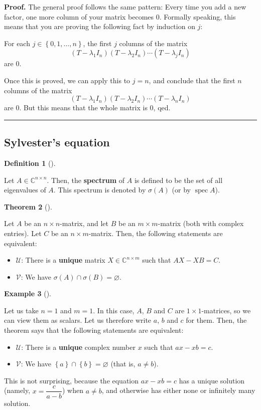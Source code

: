 \documentclass[numbers=enddot,12pt,final,onecolumn,notitlepage]{scrartcl}%
\numberwithin{exer}{subsection}
\theoremstyle{definition}
\newtheorem{theo}{Theorem}[subsection]
\newenvironment{theorem}[1][]
{\begin{theo}[#1]\begin{leftbar}}
{\end{leftbar}\end{theo}}
\newtheorem{defi}[theo]{Definition}
\newenvironment{definition}[1][]
{\begin{defi}[#1]\begin{leftbar}}
{\end{leftbar}\end{defi}}
\newtheorem{exam}[theo]{Example}
\newenvironment{example}[1][]
{\begin{exam}[#1]\begin{leftbar}}
{\end{leftbar}\end{exam}}
\newenvironment{proof}[1][Proof]{\noindent\textbf{#1.} }{\ \rule{0.5em}{0.5em}}
\begin{document}
\begin{proof}
The general proof follows the same pattern: Every time you add a new factor,
one more column of your matrix becomes $0$. Formally speaking, this means that
you are proving the following fact by induction on $j$:

For each $j\in\left\{  0,1,\ldots,n\right\}  $, the first $j$ columns of the
matrix%
\[
\left(  T-\lambda_{1}I_{n}\right)  \left(  T-\lambda_{2}I_{n}\right)
\cdots\left(  T-\lambda_{j}I_{n}\right)
\]
are $0$.

Once this is proved, we can apply this to $j=n$, and conclude that the first
$n$ columns of the matrix%
\[
\left(  T-\lambda_{1}I_{n}\right)  \left(  T-\lambda_{2}I_{n}\right)
\cdots\left(  T-\lambda_{n}I_{n}\right)
\]
are $0$. But this means that the whole matrix is $0$, qed.
\end{proof}

\subsection{Sylvester's equation}

\begin{definition}
Let $A\in\mathbb{C}^{n\times n}$. Then, the \textbf{spectrum} of $A$ is
defined to be the set of all eigenvalues of $A$. This spectrum is denoted by
$\sigma\left(  A\right)  $ (or by $\operatorname*{spec}A$).
\end{definition}

\begin{theorem}
Let $A$ be an $n\times n$-matrix, and let $B$ be an $m\times m$-matrix (both
with complex entries). Let $C$ be an $n\times m$-matrix. Then, the following
statements are equivalent:

\begin{itemize}
\item $\mathcal{U}$: There is a \textbf{unique} matrix $X\in\mathbb{C}%
^{n\times m}$ such that $AX-XB=C$.

\item $\mathcal{V}$: We have $\sigma\left(  A\right)  \cap\sigma\left(
B\right)  =\varnothing$.
\end{itemize}
\end{theorem}

\begin{example}
Let us take $n=1$ and $m=1$. In this case, $A$, $B$ and $C$ are $1\times
1$-matrices, so we can view them as scalars. Let us therefore write $a$, $b$
and $c$ for them. Then, the theorem says that the following statements are equivalent:

\begin{itemize}
\item $\mathcal{U}$: There is a \textbf{unique} complex number $x$ such that
$ax-xb=c$.

\item $\mathcal{V}$: We have $\left\{  a\right\}  \cap\left\{  b\right\}
=\varnothing$ (that is, $a\neq b$).
\end{itemize}

This is not surprising, because the equation $ax-xb=c$ has a unique solution
(namely, $x=\dfrac{c}{a-b}$) when $a\neq b$, and otherwise has either none or
infinitely many solution.
\end{example}
\end{document}
